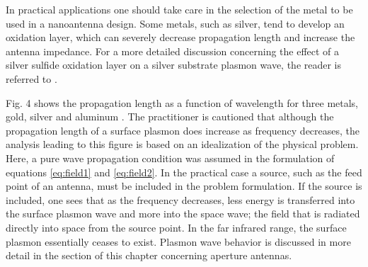 \documentclass[11pt]{article}
\begin{document}
In practical applications one should take care in the selection of the metal to be used in a nanoantenna design. Some metals, such as silver, tend to develop an oxidation layer, which can severely decrease propagation length and increase the antenna impedance. For a more detailed discussion concerning the effect of a silver sulfide oxidation layer on a silver substrate plasmon wave, the reader is referred to \cite{Nevels2014}.
%
%
%

Fig. 4 shows the propagation length as a function of wavelength for three metals, gold, silver and aluminum \cite{9783540339199}. The practitioner is cautioned that although the propagation length of a surface plasmon does increase as frequency decreases, the analysis leading to this figure is based on an idealization of the physical problem. Here, a pure wave propagation condition was assumed in the formulation of equations \eqref{eq:field1} and \eqref{eq:field2}. In the practical case a source, such as the feed point of an antenna, must be included in the problem formulation. If the source is included, one sees that as the frequency decreases, less energy is transferred into the surface plasmon wave and more into the space wave; the field that is radiated directly into space from the source point. In the far infrared range, the surface plasmon essentially ceases to exist. Plasmon wave behavior is discussed in more detail in the section of this chapter concerning aperture antennas.
%
%
\end{document}
